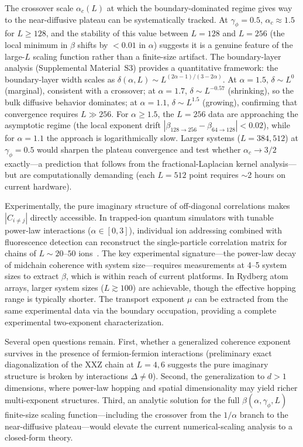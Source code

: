 \documentclass[aps,prb,twocolumn,superscriptaddress,floatfix]{revtex4-2}
\begin{document}
The crossover scale $\alpha_c(L)$ at which the boundary-dominated regime gives way to the near-diffusive plateau can be systematically tracked. At $\gamma_\phi = 0.5$, $\alpha_c \approx 1.5$ for $L \ge 128$, and the stability of this value between $L=128$ and $L=256$ (the local minimum in $\beta$ shifts by $< 0.01$ in $\alpha$) suggests it is a genuine feature of the large-$L$ scaling function rather than a finite-size artifact. The boundary-layer analysis (Supplemental Material~S3) provides a quantitative framework: the boundary-layer width scales as $\delta(\alpha,L) \sim L^{(2\alpha-1)/(3-2\alpha)}$. At $\alpha = 1.5$, $\delta \sim L^{0}$ (marginal), consistent with a crossover; at $\alpha = 1.7$, $\delta \sim L^{-0.57}$ (shrinking), so the bulk diffusive behavior dominates; at $\alpha = 1.1$, $\delta \sim L^{1.5}$ (growing), confirming that convergence requires $L \gg 256$. For $\alpha \ge 1.5$, the $L=256$ data are approaching the asymptotic regime (the local exponent drift $|\beta_{128\to256} - \beta_{64\to128}| < 0.02$), while for $\alpha = 1.1$ the approach is logarithmically slow. Larger systems ($L = 384, 512$) at $\gamma_\phi = 0.5$ would sharpen the plateau convergence and test whether $\alpha_c \to 3/2$ exactly---a prediction that follows from the fractional-Laplacian kernel analysis---but are computationally demanding (each $L=512$ point requires $\sim$2 hours on current hardware).

Experimentally, the pure imaginary structure of off-diagonal correlations makes $|C_{i\neq j}|$ directly accessible. In trapped-ion quantum simulators with tunable power-law interactions ($\alpha \in [0, 3]$), individual ion addressing combined with fluorescence detection can reconstruct the single-particle correlation matrix for chains of $L \sim 20$--$50$ ions~\cite{Landi2022}. The key experimental signature---the power-law decay of midchain coherence with system size---requires measurements at 4--5 system sizes to extract $\beta$, which is within reach of current platforms. In Rydberg atom arrays, larger system sizes ($L \gtrsim 100$) are achievable, though the effective hopping range is typically shorter. The transport exponent $\mu$ can be extracted from the same experimental data via the boundary occupation, providing a complete experimental two-exponent characterization.

Several open questions remain. First, whether a generalized coherence exponent survives in the presence of fermion-fermion interactions (preliminary exact diagonalization of the XXZ chain at $L = 4, 6$ suggests the pure imaginary structure is broken by interactions $\Delta \neq 0$). Second, the generalization to $d > 1$ dimensions, where power-law hopping and spatial dimensionality may yield richer multi-exponent structures. Third, an analytic solution for the full $\beta(\alpha,\gamma_\phi, L)$ finite-size scaling function---including the crossover from the $1/\alpha$ branch to the near-diffusive plateau---would elevate the current numerical-scaling analysis to a closed-form theory.
\end{document}
